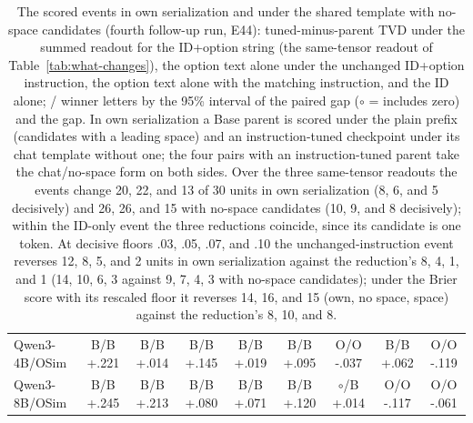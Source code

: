 \begin{table}[t]
\begin{tabular}{@{}lcccccccc@{}}
\addlinespace[2pt]
Qwen3-4B/OSim & B/B +.221 & B/B +.014 & B/B +.145 & B/B +.019 & B/B +.095 & O/O -.037 & B/B +.062 & O/O -.119 \\
Qwen3-8B/OSim & B/B +.245 & B/B +.213 & B/B +.080 & B/B +.071 & B/B +.120 & $\circ$/B +.014 & O/O -.117 & O/O -.061 \\
\bottomrule
\end{tabular}
\caption{The scored events in own serialization and under the shared template with no-space candidates (fourth follow-up run, E44): tuned-minus-parent TVD under the summed readout for the ID+option string (the same-tensor readout of Table~\ref{tab:what-changes}), the option text alone under the unchanged ID+option instruction, the option text alone with the matching instruction, and the ID alone; \ES{}/\PC{} winner letters by the 95\% interval of the paired gap ($\circ$ = includes zero) and the \PC{} gap. In own serialization a Base parent is scored under the plain prefix (candidates with a leading space) and an instruction-tuned checkpoint under its chat template without one; the four pairs with an instruction-tuned parent take the chat/no-space form on both sides. Over the three same-tensor readouts the events change 20, 22, and 13 of 30 units in own serialization (8, 6, and 5 decisively) and 26, 26, and 15 with no-space candidates (10, 9, and 8 decisively); within the ID-only event the three reductions coincide, since its candidate is one token. At decisive floors .03, .05, .07, and .10 the unchanged-instruction event reverses 12, 8, 5, and 2 units in own serialization against the reduction's 8, 4, 1, and 1 (14, 10, 6, 3 against 9, 7, 4, 3 with no-space candidates); under the Brier score with its rescaled floor it reverses 14, 16, and 15 (own, no space, space) against the reduction's 8, 10, and 8.}
\label{tab:events-own-nospace}
\end{table}
